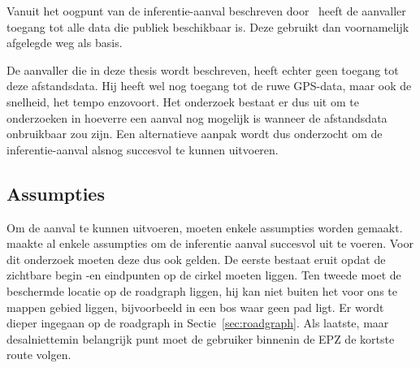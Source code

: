 Vanuit het oogpunt van de inferentie-aanval beschreven
door~\citeauthor{Dhondt_Pochat_Voulimeneas_Joosen_Volckaert_2022} heeft de
aanvaller toegang tot alle data die publiek beschikbaar is. Deze gebruikt dan
voornamelijk afgelegde weg als basis.

De aanvaller die in deze thesis wordt beschreven, heeft echter geen toegang tot
deze afstandsdata. Hij heeft wel nog toegang tot de ruwe GPS-data, maar ook de
snelheid, het tempo enzovoort. Het onderzoek bestaat er dus uit om te
onderzoeken in hoeverre een aanval nog mogelijk is wanneer de afstandsdata
onbruikbaar zou zijn. Een alternatieve aanpak wordt dus onderzocht om de
inferentie-aanval alsnog succesvol te kunnen uitvoeren.

\subsection{Assumpties}
Om de aanval te kunnen uitvoeren, moeten enkele assumpties worden gemaakt.
\citeauthor{Dhondt_Pochat_Voulimeneas_Joosen_Volckaert_2022} maakte al enkele
assumpties om de inferentie aanval succesvol uit te voeren. Voor dit onderzoek
moeten deze dus ook gelden. De eerste bestaat eruit opdat de zichtbare begin
-en eindpunten op de cirkel moeten liggen. Ten tweede moet de beschermde
locatie op de roadgraph liggen, hij kan niet buiten het voor ons te mappen
gebied liggen, bijvoorbeeld in een bos waar geen pad ligt. Er wordt dieper
ingegaan op de roadgraph in Sectie~\ref{sec:roadgraph}. Als laatste, maar
desalniettemin belangrijk punt moet de gebruiker binnenin de \ac{EPZ} de
kortste route volgen.~\cite{Dhondt_Pochat_Voulimeneas_Joosen_Volckaert_2022}

